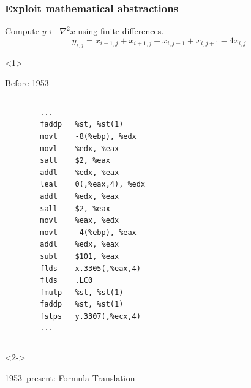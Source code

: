 \documentclass[presentation]{beamer}
\begin{document}
\begin{frame}[fragile]
  \frametitle{Exploit mathematical abstractions}
  Compute $y \leftarrow \nabla^2 x$ using finite differences.
  \begin{equation*}
    y_{i,j} = x_{i-1, j} + x_{i+1, j} + x_{i, j-1} + x_{i, j+1} - 4x_{i,j}    
  \end{equation*}
  \begin{overlayarea}{\textwidth}{0.8\textheight}
  \begin{onlyenv}<1>
    \begin{block}{Before 1953}
      \vspace{1em}
      \begin{columns}
        \begin{column}{0.5\textwidth}
\begin{verbatim}
        ...
        faddp   %st, %st(1)
        movl    -8(%ebp), %edx
        movl    %edx, %eax
        sall    $2, %eax
        addl    %edx, %eax
        leal    0(,%eax,4), %edx
        addl    %edx, %eax
        sall    $2, %eax
        movl    %eax, %edx
        movl    -4(%ebp), %eax
        addl    %edx, %eax
        subl    $101, %eax
        flds    x.3305(,%eax,4)
        flds    .LC0
        fmulp   %st, %st(1)
        faddp   %st, %st(1)
        fstps   y.3307(,%ecx,4)
        ...
\end{verbatim}
        \end{column}
        \begin{column}{0.5\textwidth}
        \end{column}
      \end{columns}
    \end{block}
  \end{onlyenv}
  \begin{onlyenv}<2->
    \begin{block}{1953--present: Formula Translation}
      \vspace{1em}
      \begin{columns}

\end{columns}
\end{block}
\end{onlyenv}
\end{overlayarea}
\end{frame}
\end{document}
